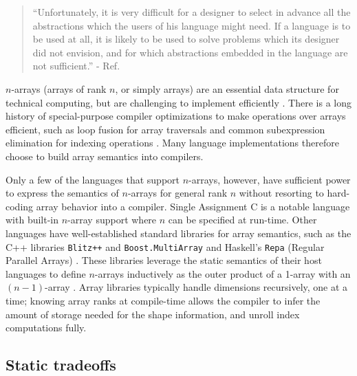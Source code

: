 \documentclass{sigplanconf}
\newcommand{\code}[1]{\texttt{#1}}
\begin{document}
\begin{quotation}
``Unfortunately, it is very difficult for a designer to select in advance all
the abstractions which the users of his language might need. If a language is
to be used at all, it is likely to be used to solve problems which its
designer did not envision, and for which abstractions embedded in the language
are not sufficient.'' - Ref. \cite{Liskov:1974pb}
\end{quotation}

$n$-arrays (arrays of rank $n$, or simply arrays) are an essential data
structure for technical computing, but are challenging to implement
efficiently \cite{Sattley:1960as,Sattley:1961as,Randell:1964a6}. There is a
long history of special-purpose compiler optimizations to make operations over
arrays efficient, such as loop fusion for array traversals and common
subexpression elimination for indexing operations \cite{Randell:1964a6,
Busam:1969oe}. Many language implementations therefore choose to build array
semantics into compilers.

Only a few of the languages that support $n$-arrays, however, have sufficient
power to express the semantics of $n$-arrays for general rank $n$ without
resorting to hard-coding array behavior into a compiler.
Single Assignment C \cite{Grelck:2006sa} is a notable language with built-in
$n$-array support where $n$ can be specified at run-time. Other languages
have well-established standard libraries for array semantics, such as
the C++ libraries 
\code{Blitz++} \cite{Veldhuizen:1998ab} and \code{Boost.MultiArray}
\cite{Garcia:2005ma} and Haskell's \code{Repa} (Regular Parallel Arrays)
\cite{Keller:2010rs,Lippmeier:2011ep, Lippmeier:2012gp}. These libraries
leverage the static semantics of their host languages to
define $n$-arrays inductively as the outer product of a 1-array with an
$(n\!\!-\!\!1)$-array \cite{Bavestrelli:2000ct}.
Array libraries typically handle dimensions recursively, one at a time;
knowing array ranks at compile-time allows the compiler to infer the amount
of storage needed for the shape information, and unroll index computations fully.


\subsection{Static tradeoffs}
\end{document}
